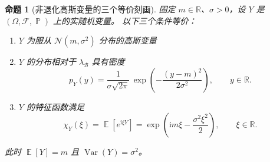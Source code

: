 \documentclass[UTF8,11pt,a4paper,oneside,fontset=fandol]{ctexrep}
\numberwithin{equation}{section}
\theoremstyle{plain}
\newtheorem{proposition}[theorem]{命题}
\theoremstyle{definition}
\theoremstyle{remark}
\newcommand{\R}{\mathbb{R}}
\newcommand{\B}{\mathcal{B}}
\newcommand{\F}{\mathcal{F}}
\DeclareMathOperator{\Prob}{\mathbb{P}}
\DeclareMathOperator{\E}{\mathbb{E}}
\DeclareMathOperator{\Var}{Var}
\begin{document}
\begin{samepage}
\begin{proposition}[非退化高斯变量的三个等价刻画]
\label{prop:gaussian-equivalent}
固定 $m\in\R$、$\sigma>0$，设 $Y$ 是 $(\Omega,\F,\Prob)$ 上的实随机变量。
以下三个条件等价：
\begin{enumerate}[label=(\arabic*),leftmargin=2.6em]
  \item $Y$ 为服从 $\mathcal{N}(m,\sigma^2)$ 分布的高斯变量

  \item $Y$ 的分布相对于 $\lambda_{\B}$ 具有密度
  \begin{equation}
    \label{eq:gaussian-density-general}
    p_Y(y)
    =\frac{1}{\sigma\sqrt{2\pi}}\,
      \exp\!\left(-\frac{(y-m)^2}{2\sigma^2}\right),
    \qquad y\in\R.
  \end{equation}

  \item $Y$ 的特征函数满足
  \begin{equation}
    \label{eq:gaussian-characteristic-general}
    \chi_Y(\xi)
    =\E\!\left[e^{\mathrm{i}\xi Y}\right]
    =\exp\!\left(\mathrm{i}m\xi-\frac{\sigma^2\xi^2}{2}\right),
    \qquad \xi\in\R.
  \end{equation}
\end{enumerate}
此时 $\E[Y]=m$ 且 $\Var(Y)=\sigma^2$。
\end{proposition}
\end{samepage}
\end{document}
